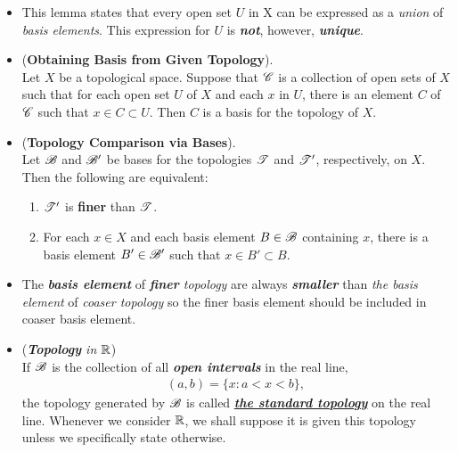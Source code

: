 \documentclass[11pt]{article}
\begin{document}
\begin{itemize}
\item \begin{remark}
This lemma states that every open set $U$ in X can be expressed as a \emph{union} of \emph{basis elements}. This expression for $U$ is \emph{\textbf{not}}, however, \emph{\textbf{unique}}.
\end{remark}

\item \begin{lemma} (\textbf{Obtaining Basis from Given Topology}). \citep{munkres2000topology}\\
Let $X$ be a topological space. Suppose that ${\mathscr C}$ is a collection of open sets of $X$ such that for each open set $U$ of $X$ and each $x$ in $U$, there is an element $C$ of ${\mathscr C}$ such that $x \in C \subset U$. Then $C$ is a basis for the topology of $X$.
\end{lemma}

\item \begin{lemma} (\textbf{Topology Comparison via Bases}). \citep{munkres2000topology}\\
Let ${\mathscr B}$ and ${\mathscr B}'$ be bases for the topologies ${\mathscr T}$ and ${\mathscr T}'$, respectively, on $X$. Then the following are equivalent:
\begin{enumerate}
\item  ${\mathscr T}'$ is \textbf{finer} than ${\mathscr T}$.
\item For each $x \in X$ and each basis element $B \in {\mathscr B}$ containing $x$, there is a basis element $B' \in {\mathscr B}'$ such that $x \in B' \subset B$.
\end{enumerate}
\end{lemma}

\item \begin{remark}
The \emph{\textbf{basis element}} of \emph{\textbf{finer} topology} are always \emph{\textbf{smaller}} than \emph{the basis element} of \emph{coaser topology} so the finer basis element should be included in coaser basis element.
\end{remark}

\item \begin{example} (\emph{\textbf{Topology} in ${\mathbb R}$})\\
If ${\mathscr B}$ is the collection of all \emph{\textbf{open intervals}} in the real line,
\begin{align*}
(a,b) = \{x: a < x < b\},
\end{align*}
the topology generated by ${\mathscr B}$ is called \underline{\emph{\textbf{the standard topology}}} on the real line. Whenever we consider ${\mathbb R}$, we shall suppose it is given this topology unless we specifically state otherwise.


\end{example}
\end{itemize}
\end{document}
